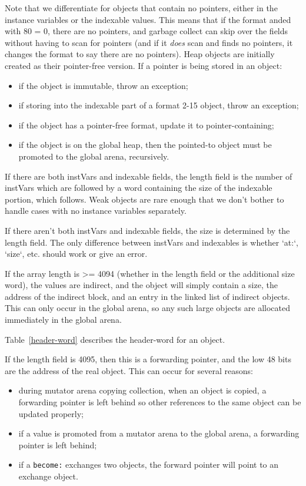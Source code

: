 \documentclass[
]{ceurart}
\def\Tabref{Table~\ref}
\begin{document}
Note that we differentiate for objects that contain no pointers, either in the instance variables or the indexable values.
This means that if the format anded with 80 = 0, there are no pointers, and garbage collect can skip over the fields without having to scan for pointers (and if it {\em does} scan and finds no pointers, it changes the format to say there are no pointers).
Heap objects are initially created as their pointer-free version.
If a pointer is being stored in an object:
\begin{itemize}
\item if the object is immutable, throw an exception;
\item if storing into the indexable part of a format 2-15 object, throw an exception;
\item if the object has a pointer-free format, update it to pointer-containing;
\item if the object is on the global heap, then the pointed-to object must be promoted to the global arena, recursively.
\end{itemize}

If there are both instVars and indexable fields, the length field is the number of instVars which are followed by a word containing the size of the indexable portion, which follows.
Weak objects are rare enough that we don't bother to handle cases with no instance variables separately.

If there aren't both  instVars and indexable fields, the size is determined by the length field. The only difference between instVars and indexables is whether `at:`, `size`, etc. should work or give an error.

If the array length is >= 4094 (whether in the length field or the additional size word), the values are indirect, and the object will simply contain a size, the address of the indirect block, and an entry in the linked list of indirect objects.
This can only occur in the global arena, so any such large objects are allocated immediately in the global arena.

\Tabref{header-word} describes the header-word for an object.

If the length field is 4095, then this is a forwarding pointer, and the low 48 bits are the address of the real object.
This can occur for several reasons:
\begin{itemize}
\item during mutator arena copying collection, when an object is copied, a forwarding pointer is left behind so other references to the same object can be updated properly;
\item if a value is promoted from a mutator arena to the global arena, a forwarding pointer is left behind;
\item if a \verb_become:_ exchanges two objects, the forward pointer will point to an exchange object.
\end{itemize}
\end{document}
